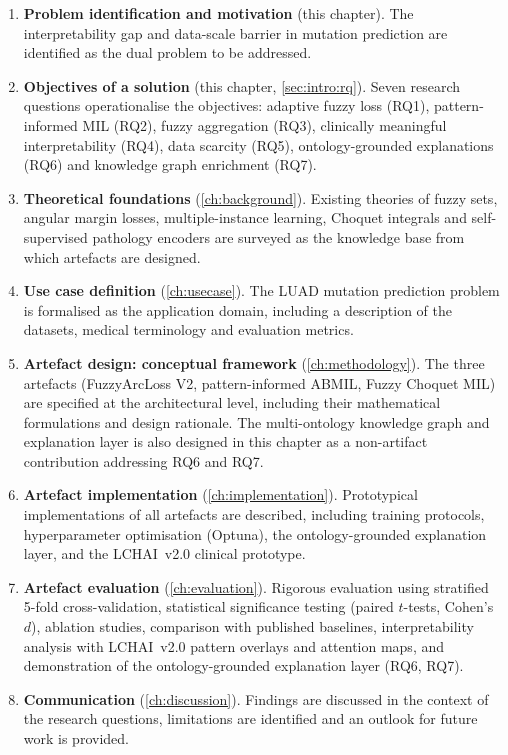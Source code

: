 \begin{enumerate}
    \item \textbf{Problem identification and motivation} (this chapter).  The interpretability gap and data-scale barrier in mutation prediction are identified as the dual problem to be addressed.

    \item \textbf{Objectives of a solution} (this chapter, \cref{sec:intro:rq}).  Seven research questions operationalise the objectives: adaptive fuzzy loss (RQ1), pattern-informed MIL (RQ2), fuzzy aggregation (RQ3), clinically meaningful interpretability (RQ4), data scarcity (RQ5), ontology-grounded explanations (RQ6) and knowledge graph enrichment (RQ7).

    \item \textbf{Theoretical foundations} (\cref{ch:background}).  Existing theories of fuzzy sets, angular margin losses, multiple-instance learning, Choquet integrals and self-supervised pathology encoders are surveyed as the knowledge base from which artefacts are designed.

    \item \textbf{Use case definition} (\cref{ch:usecase}).  The LUAD mutation prediction problem is formalised as the application domain, including a description of the datasets, medical terminology and evaluation metrics.

    \item \textbf{Artefact design: conceptual framework} (\cref{ch:methodology}).  The three artefacts (FuzzyArcLoss V2, pattern-informed ABMIL, Fuzzy Choquet MIL) are specified at the architectural level, including their mathematical formulations and design rationale.  The multi-ontology knowledge graph and explanation layer is also designed in this chapter as a non-artifact contribution addressing RQ6 and RQ7.

    \item \textbf{Artefact implementation} (\cref{ch:implementation}).  Prototypical implementations of all artefacts are described, including training protocols, hyperparameter optimisation (Optuna), the ontology-grounded explanation layer, and the LCHAI~v2.0 clinical prototype.

    \item \textbf{Artefact evaluation} (\cref{ch:evaluation}).  Rigorous evaluation using stratified 5-fold cross-validation, statistical significance testing (paired $t$-tests, Cohen's $d$), ablation studies, comparison with published baselines, interpretability analysis with LCHAI~v2.0 pattern overlays and attention maps, and demonstration of the ontology-grounded explanation layer (RQ6, RQ7).

    \item \textbf{Communication} (\cref{ch:discussion}).  Findings are discussed in the context of the research questions, limitations are identified and an outlook for future work is provided.
\end{enumerate}


